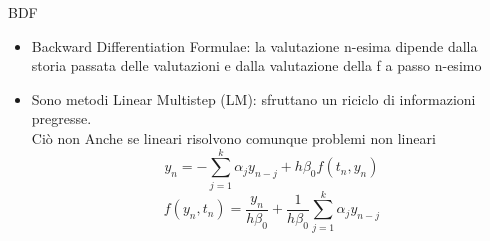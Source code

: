\documentclass[aspectratio=169, 10pt, handout,usenames,dvipsnames]{beamer}
\begin{document}
    \begin{frame}{BDF}
        \begin{itemize}
            \item Backward Differentiation Formulae: la valutazione n-esima dipende dalla storia passata delle valutazioni e dalla valutazione della f a passo n-esimo
            \item Sono metodi Linear Multistep (LM): 
                  sfruttano un riciclo di informazioni pregresse. \\ Ciò non Anche se lineari risolvono comunque problemi non lineari
            \[ y_n=-\displaystyle\sum_{j=1}^k \alpha_j y_{n-j} + h\beta_0 f(t_n,y_n) \]
            \[ f(y_n, t_n) = \dfrac{y_n}{h \beta_0} + \dfrac{1}{h \beta_0} \sum_{j=1}^{k}\alpha_j y_{n-j}\]
        \end{itemize}
    \end{frame}
    
\end{document}
